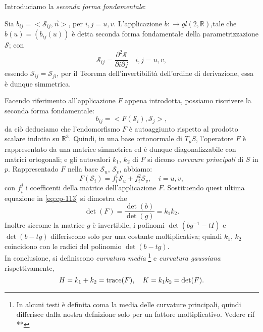 Introduciamo la \emph{seconda forma fondamentale}:
\begin{definizione}
Sia $b_{ij}=<\mathcal{S}_{ij},\vec{n}>$, per $i,j=u,v$. L'applicazione $b:\longrightarrow gl(2,\mathbb{R})$,tale che $b(u)=(b_{ij}(u))$ è detta seconda forma fondamentale della parametrizzazione $\mathcal{S}$; con
\[
\mathcal{S}_{ij}=\frac{\partial^2\mathcal{S}}{\partial i\partial j}\quad i,j = u,v,
\]
essendo $\mathcal{S}_{ij}=\mathcal{S}_{ji}$, per il Teorema dell'invertibilità dell'ordine di derivazione, essa è dunque simmetrica.
\end{definizione}
Facendo riferimento all'applicazione $F$ appena introdotta, possiamo riscrivere la seconda forma fondamentale:
\begin{equation}
\label{eq:cp-113}
b_{ij}=<F(\mathcal{S}_i),\mathcal{S}_j>,
\end{equation}
da ciò deduciamo che l'endomorfismo $F$ è autoaggiunto rispetto al prodotto scalare indotto su $\mathbb{R}^3$. Quindi, in una base ortonormale di $T_pS$, l'operatore $F$ è rappresentato da una matrice simmetrica ed è dunque diagonalizzabile con matrici ortogonali; e gli autovalori $k_1$, $k_2$ di $F$ si dicono \emph{curvaure principali} di $S$ in $p$. Rappresentado $F$ nella base $\mathcal{S}_u$, $\mathcal{S}_v$, abbiamo:
\[
F(\mathcal{S}_i) = f_i^1\mathcal{S}_u + f_i^2\mathcal{S}_v,\quad i=u,v,
\]
con $f_i^j$ i coefficenti della matrice dell'applicazione $F$. Sostituendo quest ultima equazione in \eqref{eq:cp-113} si dimostra che
\[
\det(F) = \frac{\det(b)}{\det(g)}=k_1k_2.
\]
Inoltre siccome la matrice $g$ è invertibile, i polinomi $\det(bg^{-1}-tI)$ e $\det(b-tg)$ differiscono solo per una costante moltiplicativa; quindi $k_1$, $k_2$ coincidono con le radici del polinomio $\det(b-tg)$. \\
In conclusione, si definiscono \emph{curvatura media} 
\footnote{In alcuni testi è definita coma la media delle curvature principali, quindi differisce dalla nostra defnizione solo per un fattore moltiplicativo. Vedere rif **}    %
e \emph{curvatura gaussiana} rispettivamente,
\[
H=k_1+k_2=\operatorname{trace}(F),\quad K=k_1k_2=\det(F).
\]
